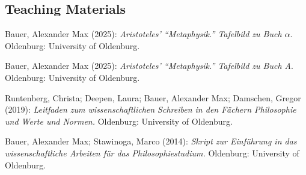 \documentclass[a4paper,10pt]{article}
\newenvironment{literature}{%
   \parskip6pt\parindent0pt\raggedright
   \def\lititem{\hangindent=1cm\hangafter1}}{%
   \par\ignorespaces}
\begin{document}
\subsection*{Teaching Materials}
\begin{literature}
\lititem Bauer, Alexander Max (2025): \textit{Aristoteles' \enquote{Metaphysik.} Tafelbild zu Buch $\alpha$}. Oldenburg: University of Oldenburg.

\lititem Bauer, Alexander Max (2025): \textit{Aristoteles' \enquote{Metaphysik.} Tafelbild zu Buch A}. Oldenburg: University of Oldenburg.

\lititem Runtenberg, Christa; Deepen, Laura; Bauer, Alexander Max; Damschen, Gregor (2019): \textit{Leitfaden zum wissenschaftlichen Schreiben in den Fächern Philosophie und Werte und Normen.} Oldenburg: University of Oldenburg.

\lititem Bauer, Alexander Max; Stawinoga, Marco (2014): \textit{Skript zur Einführung in das wissenschaftliche Arbeiten für das Philosophiestudium.} Oldenburg: University of Oldenburg.
\end{literature}
\end{document}
